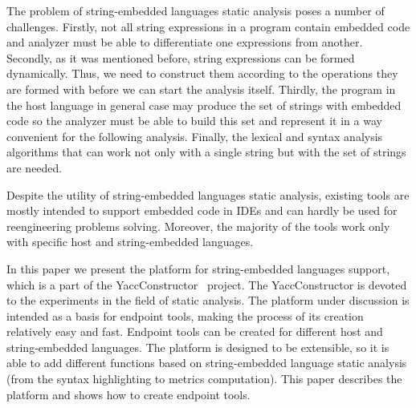 The problem of string-embedded languages static analysis poses a number of challenges. Firstly, not all string expressions in a program contain embedded code and analyzer must be able to differentiate one expressions from another. Secondly, as it was mentioned before, string expressions can be formed dynamically. Thus, we need to construct them according to the operations they are formed with before we can start the analysis itself. Thirdly, the program in the host language in general case may produce the set of strings with embedded code so the analyzer must be able to build this set and represent it in a way convenient for the following analysis. Finally, the lexical and syntax analysis algorithms that can work not only with a single string but with the set of strings are needed.

Despite the utility of string-embedded languages static analysis, existing tools are mostly intended to support embedded code in IDEs and can hardly be used for reengineering problems solving. Moreover, the majority of the tools work only with specific host and string-embedded languages.

In this paper we present the platform for string-embedded languages support, which is a part of the  YaccConstructor~\cite{YaccConstructor:ref} project. The YaccConstructor is devoted to the experiments in the field of static analysis. The platform under discussion is intended as a basis for endpoint tools, making the process of its creation relatively easy and fast. Endpoint tools can be created for different host and string-embedded languages. The platform is designed to be extensible, so it is able to add different functions based on string-embedded language static analysis (from the syntax highlighting to metrics computation). This paper describes the platform and shows how to create endpoint tools.